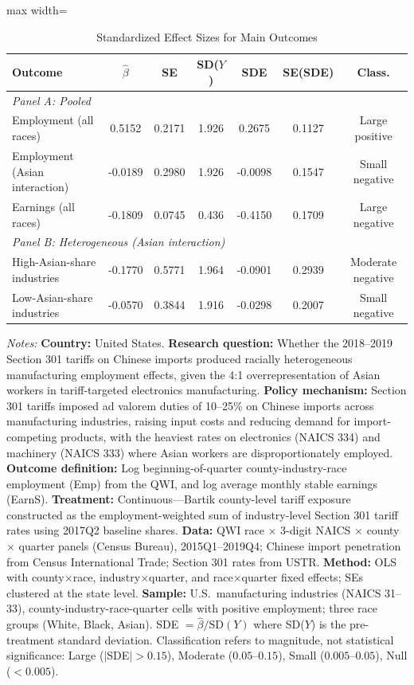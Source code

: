 \begin{table}[H]
\centering
\caption{Standardized Effect Sizes for Main Outcomes}
\label{tab:sde}
\begin{adjustbox}{max width=\textwidth}
\begin{threeparttable}
\small
\begin{tabular}{lcccccc}
\toprule
Outcome & $\hat{\beta}$ & SE & SD($Y$) & SDE & SE(SDE) & Class. \\
\midrule
\multicolumn{7}{l}{\textit{Panel A: Pooled}} \\
Employment (all races) & 0.5152 & 0.2171 & 1.926 & 0.2675 & 0.1127 & Large positive \\
Employment (Asian interaction) & -0.0189 & 0.2980 & 1.926 & -0.0098 & 0.1547 & Small negative \\
Earnings (all races) & -0.1809 & 0.0745 & 0.436 & -0.4150 & 0.1709 & Large negative \\
\midrule
\multicolumn{7}{l}{\textit{Panel B: Heterogeneous (Asian interaction)}} \\
High-Asian-share industries & -0.1770 & 0.5771 & 1.964 & -0.0901 & 0.2939 & Moderate negative \\
Low-Asian-share industries & -0.0570 & 0.3844 & 1.916 & -0.0298 & 0.2007 & Small negative \\
\bottomrule
\end{tabular}
\begin{tablenotes}[flushleft]
\scriptsize
\item \textit{Notes:} \textbf{Country:} United States. \textbf{Research question:} Whether the 2018--2019 Section 301 tariffs on Chinese imports produced racially heterogeneous manufacturing employment effects, given the 4:1 overrepresentation of Asian workers in tariff-targeted electronics manufacturing. \textbf{Policy mechanism:} Section 301 tariffs imposed ad valorem duties of 10--25\% on Chinese imports across manufacturing industries, raising input costs and reducing demand for import-competing products, with the heaviest rates on electronics (NAICS 334) and machinery (NAICS 333) where Asian workers are disproportionately employed. \textbf{Outcome definition:} Log beginning-of-quarter county-industry-race employment (Emp) from the QWI, and log average monthly stable earnings (EarnS). \textbf{Treatment:} Continuous---Bartik county-level tariff exposure constructed as the employment-weighted sum of industry-level Section 301 tariff rates using 2017Q2 baseline shares. \textbf{Data:} QWI race $\times$ 3-digit NAICS $\times$ county $\times$ quarter panels (Census Bureau), 2015Q1--2019Q4; Chinese import penetration from Census International Trade; Section 301 rates from USTR. \textbf{Method:} OLS with county$\times$race, industry$\times$quarter, and race$\times$quarter fixed effects; SEs clustered at the state level. \textbf{Sample:} U.S.\ manufacturing industries (NAICS 31--33), county-industry-race-quarter cells with positive employment; three race groups (White, Black, Asian). SDE $= \hat{\beta} / \text{SD}(Y)$ where SD($Y$) is the pre-treatment standard deviation. Classification refers to magnitude, not statistical significance: Large ($|$SDE$| > 0.15$), Moderate ($0.05$--$0.15$), Small ($0.005$--$0.05$), Null ($< 0.005$).

\end{tablenotes}
\end{threeparttable}
\end{adjustbox}
\end{table}
